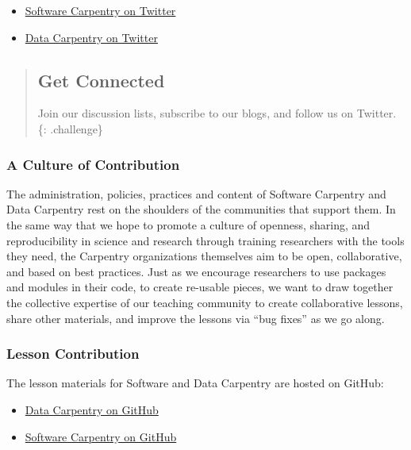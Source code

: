 \begin{itemize}
  \begin{itemize}
  \itemsep1pt\parskip0pt
  \item
    \href{https://twitter.com/swcarpentry}{Software Carpentry on
    Twitter}
  \item
    \href{https://twitter.com/datacarpentry}{Data Carpentry on Twitter}
  \end{itemize}
\end{itemize}

\begin{quote}
\subsection{Get Connected}\label{get-connected}

Join our discussion lists, subscribe to our blogs, and follow us on
Twitter. \{: .challenge\}
\end{quote}

\subsubsection{A Culture of
Contribution}\label{a-culture-of-contribution}

The administration, policies, practices and content of Software
Carpentry and Data Carpentry rest on the shoulders of the communities
that support them. In the same way that we hope to promote a culture of
openness, sharing, and reproducibility in science and research through
training researchers with the tools they need, the Carpentry
organizations themselves aim to be open, collaborative, and based on
best practices. Just as we encourage researchers to use packages and
modules in their code, to create re-usable pieces, we want to draw
together the collective expertise of our teaching community to create
collaborative lessons, share other materials, and improve the lessons
via ``bug fixes'' as we go along.

\subsubsection{Lesson Contribution}\label{lesson-contribution}

The lesson materials for Software and Data Carpentry are hosted on
GitHub:

\begin{itemize}
\itemsep1pt\parskip0pt
\item
  \href{\{\{\%20site.dc\_github\%20\}\}}{Data Carpentry on GitHub}
\item
  \href{\{\{\%20site.swc\_github\%20\}\}}{Software Carpentry on GitHub}
\end{itemize}

